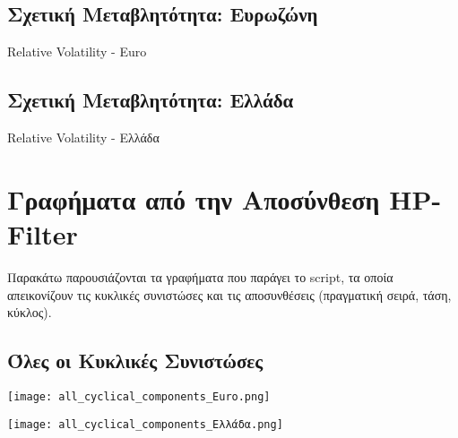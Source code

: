 \documentclass{book}
\begin{document}
\subsection{Σχετική Μεταβλητότητα: Ευρωζώνη}
\begin{table}[h!]
\centering
\caption{Relative Volatility - Euro}
\end{table}
\FloatBarrier

\subsection{Σχετική Μεταβλητότητα: Ελλάδα}
\begin{table}[h!]
\centering
\caption{Relative Volatility - Ελλάδα}
\end{table}
\FloatBarrier

\section{Γραφήματα από την Αποσύνθεση HP-Filter}
Παρακάτω παρουσιάζονται τα γραφήματα που παράγει το script, τα οποία απεικονίζουν τις κυκλικές συνιστώσες και τις αποσυνθέσεις (πραγματική σειρά, τάση, κύκλος).
\graphicspath{{/Users/thodoreskourtales/TK.MT.1/exercise.6/}}
\subsection{Όλες οι Κυκλικές Συνιστώσες}
\begin{tcolorbox}[colback=white,colframe=black,title={Όλες οι Κυκλικές Συνιστώσες - Ευρωζώνη}]
  \centering
  \texttt{[image: all\_cyclical\_components\_Euro.png]}
  \vspace{0.5em}

\end{tcolorbox}
\FloatBarrier

\begin{tcolorbox}[colback=white,colframe=black,title={Όλες οι Κυκλικές Συνιστώσες - Ελλάδα}]
  \centering
  \texttt{[image: all\_cyclical\_components\_Ελλάδα.png]}
  \vspace{0.5em}

\end{tcolorbox}
\FloatBarrier
\end{document}

